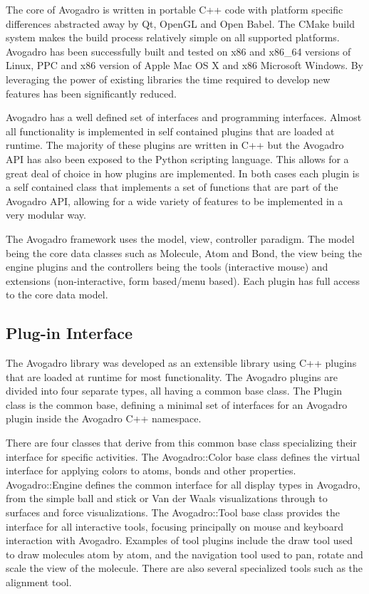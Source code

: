\documentclass[10pt]{bmc_article}
\newenvironment{bmcformat}{\begin{raggedright}
\baselineskip20pt\sloppy\setboolean{publ}{false}}{\end{raggedright}
\baselineskip20pt\sloppy}
\begin{document}
\begin{bmcformat}
The core of Avogadro is written in portable C++ code with platform specific
differences abstracted away by Qt, OpenGL and Open Babel. The CMake build system
makes the build process relatively simple on all supported platforms. Avogadro
has been successfully built and tested on x86 and x86\_64 versions of Linux, PPC
and x86 version of Apple Mac OS X and x86 Microsoft Windows. By leveraging the
power of existing libraries the time required to develop new features has been
significantly reduced.

Avogadro has a well defined set of interfaces and programming interfaces. Almost
all functionality is implemented in self contained plugins that are loaded at
runtime. The majority of these plugins are written in C++ but the Avogadro API
has also been exposed to the Python scripting language. This allows for a great
deal of choice in how plugins are implemented. In both cases each plugin is a
self contained class that implements a set of functions that are part of the
Avogadro API, allowing for a wide variety of features to be implemented in a
very modular way.

The Avogadro framework uses the model, view, controller paradigm. The model
being the core data classes such as Molecule, Atom and Bond, the view being the
engine plugins and the controllers being the tools (interactive mouse) and
extensions (non-interactive, form based/menu based). Each plugin has full access
to the core data model.

\subsection{Plug-in Interface}

The Avogadro library was developed as an extensible library using C++ plugins
that are loaded at runtime for most functionality. The Avogadro plugins are
divided into four separate types, all having a common base class. The Plugin
class is the common base, defining a minimal set of interfaces for an Avogadro
plugin inside the Avogadro C++ namespace.

There are four classes that derive from this common base class specializing
their interface for specific activities. The Avogadro::Color base class defines
the virtual interface for applying colors to atoms, bonds and other properties.
Avogadro::Engine defines the common interface for all display types in Avogadro,
from the simple ball and stick or Van der Waals visualizations through to
surfaces and force visualizations. The Avogadro::Tool base class provides
the interface for all interactive tools, focusing principally on mouse and
keyboard interaction with Avogadro. Examples of tool plugins include the draw
tool used to draw molecules atom by atom, and the navigation tool used to pan,
rotate and scale the view of the molecule. There are also several specialized
tools such as the alignment tool.


\end{bmcformat}
\end{document}
